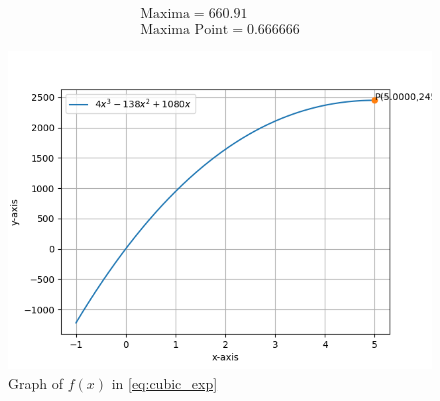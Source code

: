 \documentclass[journal,10pt,twocolumn]{article}
\begin{document}
    \begin{align}
        \boxed{\text{Maxima} = 660.91}\\
        \boxed{\text{Maxima Point} = 0.666666}
    \end{align}

\begin{figure}[t]
	\centering
	\includegraphics[width=1\columnwidth]{fig1.png}
	\caption{Graph of $f(x)$ in \eqref{eq:cubic_exp}}
	\label{fig:graph_fx}
\end{figure}
\end{document}
